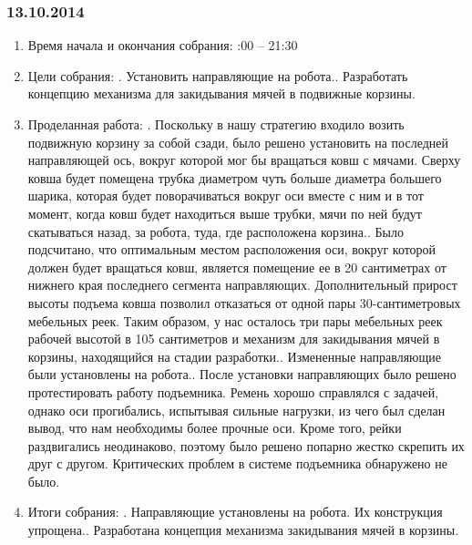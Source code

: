 \documentclass[11pt]{article}
\begin{document}
         \subsubsection{13.10.2014}
         \begin{enumerate}
            \item Время начала и окончания собрания:
            :00 – 21:30
            \item Цели собрания:
            .   Установить направляющие на робота..   Разработать концепцию механизма для закидывания мячей в подвижные корзины.
            \item Проделанная работа:
            .   Поскольку в нашу стратегию входило возить подвижную корзину за собой сзади, было решено установить на последней направляющей ось, вокруг которой мог бы вращаться ковш с мячами. Сверху ковша будет помещена трубка диаметром чуть больше диаметра большего шарика, которая будет поворачиваться вокруг оси вместе с ним и в тот момент, когда ковш будет находиться выше трубки, мячи по ней будут скатываться назад, за робота, туда, где расположена корзина..   Было подсчитано, что оптимальным местом расположения оси, вокруг которой должен будет вращаться ковш, является помещение ее в 20 сантиметрах от нижнего края последнего сегмента направляющих. Дополнительный прирост высоты подъема ковша позволил отказаться от одной пары 30-сантиметровых мебельных реек. Таким образом, у нас осталось три пары мебельных реек рабочей высотой в 105 сантиметров и механизм для закидывания мячей в корзины, находящийся на стадии разработки..   Измененные направляющие были установлены на робота..   После установки направляющих было решено протестировать работу подъемника. Ремень хорошо справлялся с задачей, однако оси прогибались, испытывая сильные нагрузки, из чего был сделан вывод, что нам необходимы более прочные оси. Кроме того, рейки раздвигались неодинаково, поэтому было решено попарно жестко скрепить  их друг с другом. Критических проблем в системе подъемника обнаружено не было.
            
            \item Итоги собрания:
            .   Направляющие установлены на робота. Их конструкция упрощена..   Разработана концепция механизма закидывания мячей в корзины.
            

\end{enumerate}
\end{document}
